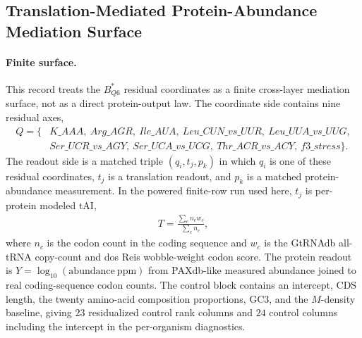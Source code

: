 \subsection{Translation-Mediated Protein-Abundance Mediation Surface}
\label{sec:q6-translation-mediated-protein-abundance-cross-layer}

\paragraph{Finite surface.}
This record treats the $B^*_{Q6}$ residual coordinates as a finite cross-layer mediation surface, not as a direct protein-output law. The coordinate side contains nine residual axes,
$$
\begin{aligned}
Q=\{&K\_AAA,\ Arg\_AGR,\ Ile\_AUA,\ Leu\_CUN\_vs\_UUR,\ Leu\_UUA\_vs\_UUG,\\
&Ser\_UCR\_vs\_AGY,\ Ser\_UCA\_vs\_UCG,\ Thr\_ACR\_vs\_ACY,\ f3\_stress\}.
\end{aligned}
$$
The readout side is a matched triple $(q_i,t_j,p_k)$ in which $q_i$ is one of these residual coordinates, $t_j$ is a translation readout, and $p_k$ is a matched protein-abundance measurement. In the powered finite-row run used here, $t_j$ is per-protein modeled tAI,
$$
\begin{aligned}
T=\frac{\sum_c n_c w_c}{\sum_c n_c},
\end{aligned}
$$
where $n_c$ is the codon count in the coding sequence and $w_c$ is the GtRNAdb all-tRNA copy-count and dos Reis wobble-weight codon score. The protein readout is $Y=\log_{10}(\mathrm{abundance\ ppm})$ from PAXdb-like measured abundance joined to real coding-sequence codon counts. The control block contains an intercept, CDS length, the twenty amino-acid composition proportions, GC3, and the $M$-density baseline, giving $23$ residualized control rank columns and $24$ control columns including the intercept in the per-organism diagnostics.

